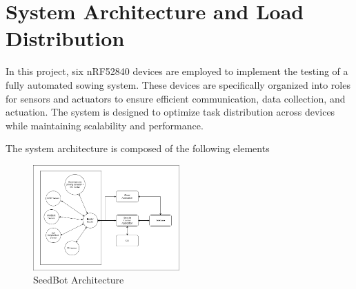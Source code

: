 \chapter{System Architecture and Load Distribution}

In this project, six nRF52840 devices are employed to implement the testing of a fully automated sowing system. These devices are specifically organized into roles for sensors and actuators to ensure efficient communication, data collection, and actuation. The system is designed to optimize task distribution across devices while maintaining scalability and performance.

The system architecture is composed of the following elements


\begin{figure}[H]
    \centering
    \includegraphics[width=0.5\textwidth]{media/IoT_architecture.png}
    \caption{SeedBot Architecture}
    \label{fig:SeedBot Architecture}
\end{figure}


